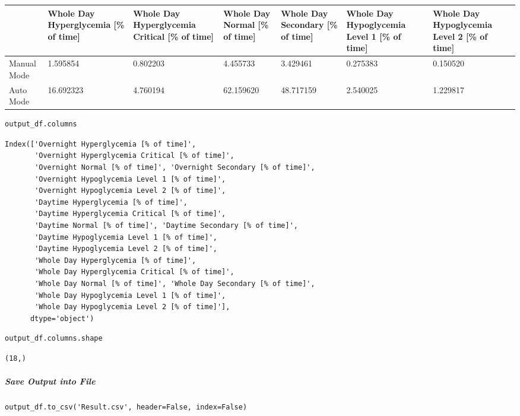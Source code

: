 \bigskip\noindent
\begin{tabular}{p{}p{}p{}p{}p{}p{}p{}}
\toprule
 & Whole Day Hyperglycemia [\% of time] & Whole Day Hyperglycemia Critical [\% of time] & Whole Day Normal [\% of time] & Whole Day Secondary [\% of time] & Whole Day Hypoglycemia Level 1 [\% of time] & Whole Day Hypoglycemia Level 2 [\% of time] \\
\hline
Manual Mode & 1.595854 & 0.802203 & 4.455733 & 3.429461 & 0.275383 & 0.150520 \\
\hline
Auto Mode & 16.692323 & 4.760194 & 62.159620 & 48.717159 & 2.540025 & 1.229817 \\
\hline
\bottomrule
\end{tabular}

\bigskip

\begin{verbatim}
output_df.columns
\end{verbatim}

\begin{verbatim}
Index(['Overnight Hyperglycemia [% of time]',
       'Overnight Hyperglycemia Critical [% of time]',
       'Overnight Normal [% of time]', 'Overnight Secondary [% of time]',
       'Overnight Hypoglycemia Level 1 [% of time]',
       'Overnight Hypoglycemia Level 2 [% of time]',
       'Daytime Hyperglycemia [% of time]',
       'Daytime Hyperglycemia Critical [% of time]',
       'Daytime Normal [% of time]', 'Daytime Secondary [% of time]',
       'Daytime Hypoglycemia Level 1 [% of time]',
       'Daytime Hypoglycemia Level 2 [% of time]',
       'Whole Day Hyperglycemia [% of time]',
       'Whole Day Hyperglycemia Critical [% of time]',
       'Whole Day Normal [% of time]', 'Whole Day Secondary [% of time]',
       'Whole Day Hypoglycemia Level 1 [% of time]',
       'Whole Day Hypoglycemia Level 2 [% of time]'],
      dtype='object')
\end{verbatim}

\begin{verbatim}
output_df.columns.shape
\end{verbatim}

\begin{verbatim}
(18,)
\end{verbatim}

\subparagraph{Save Output into File}

\begin{verbatim}
output_df.to_csv('Result.csv', header=False, index=False)
\end{verbatim}